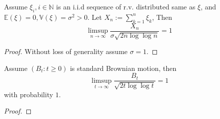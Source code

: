 
\begin{lemma}\label{lem:2}
  Assume \(\xi_i,i \in \mathbb{N}\) is an i.i.d sequence of r.v. distributed same as \(\xi\),
  and \(\mathbb{E}(\xi)=0,\mathbb{V}(\xi)=\sigma^2>0\).
  Let \(X_n:=\sum_{k=1}^{n}\xi_k\),
  Then
  \[
    \limsup_{n \to \infty}\frac{X_n}{\sigma \sqrt{2 n \log \log n}}=1
  \]
\end{lemma}
\begin{proof}
  Without loss of generality assume \(\sigma=1\).

\end{proof}

\begin{lemma}\label{lem:1}
  Assume \((B_t:t \geq 0)\) is standard Brownian motion, then
  \[
    \limsup_{t \to \infty}\frac{B_t}{\sqrt{2t \log \log t}}=1
  \]
  with probability \(1\).
\end{lemma}
\begin{proof}

\end{proof}


